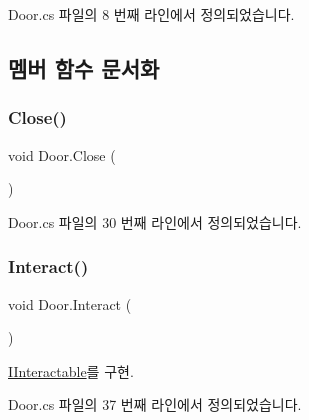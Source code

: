 Door.\+cs 파일의 8 번째 라인에서 정의되었습니다.



\subsection{멤버 함수 문서화}
\mbox{\label{class_door_a4ee490d221509a60073df05c186df9e6}} 
\subsubsection{\texorpdfstring{Close()}{Close()}}
{\footnotesize\ttfamily void Door.\+Close (\begin{DoxyParamCaption}{ }\end{DoxyParamCaption})}



Door.\+cs 파일의 30 번째 라인에서 정의되었습니다.


\begin{DoxyCode}{0}

\end{DoxyCode}
\mbox{\label{class_door_af8fed06499c3e6ffe6d993b5b341c54f}} 
\subsubsection{\texorpdfstring{Interact()}{Interact()}}
{\footnotesize\ttfamily void Door.\+Interact (\begin{DoxyParamCaption}{ }\end{DoxyParamCaption})}



\mbox{\hyperlink{interface_i_interactable_a6e8c9bc1f27bc2a5c81f674ceeac024c}{I\+Interactable}}를 구현.



Door.\+cs 파일의 37 번째 라인에서 정의되었습니다.


